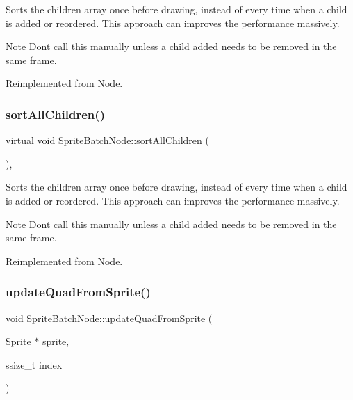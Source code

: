 Sorts the children array once before drawing, instead of every time when a child is added or reordered. This approach can improves the performance massively. \begin{DoxyNote}{Note}
Don\textquotesingle{}t call this manually unless a child added needs to be removed in the same frame. 
\end{DoxyNote}


Reimplemented from \hyperlink{classNode_adfaeea03013d3eae710c4d4d725bce0b}{Node}.

\mbox{\label{classSpriteBatchNode_a939e68291147526d7d452a310b59b0b7}} 
\subsubsection{\texorpdfstring{sort\+All\+Children()}{sortAllChildren()}\hspace{0.1cm}{\footnotesize\ttfamily [2/2]}}
{\footnotesize\ttfamily virtual void Sprite\+Batch\+Node\+::sort\+All\+Children (\begin{DoxyParamCaption}{ }\end{DoxyParamCaption})\hspace{0.3cm}{\ttfamily [override]}, {\ttfamily [virtual]}}

Sorts the children array once before drawing, instead of every time when a child is added or reordered. This approach can improves the performance massively. \begin{DoxyNote}{Note}
Don\textquotesingle{}t call this manually unless a child added needs to be removed in the same frame. 
\end{DoxyNote}


Reimplemented from \hyperlink{classNode_adfaeea03013d3eae710c4d4d725bce0b}{Node}.

\mbox{\label{classSpriteBatchNode_a408788d1a225c2cb9787a4657d861b20}} 
\subsubsection{\texorpdfstring{update\+Quad\+From\+Sprite()}{updateQuadFromSprite()}\hspace{0.1cm}{\footnotesize\ttfamily [1/2]}}
{\footnotesize\ttfamily void Sprite\+Batch\+Node\+::update\+Quad\+From\+Sprite (\begin{DoxyParamCaption}\item[{\hyperlink{classSprite}{Sprite} $\ast$}]{sprite,  }\item[{ssize\+\_\+t}]{index }\end{DoxyParamCaption})\hspace{0.3cm}{\ttfamily [protected]}}

